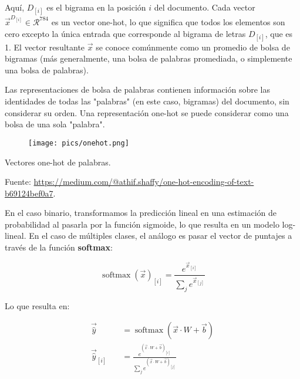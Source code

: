 Aquí, $D_{[i]}$ es el bigrama en la posición $i$ del documento. Cada vector $\vec{x}^{D_{[i]}} \in \mathcal{R}^{784}$ es un vector one-hot, lo que significa que todos los elementos son cero excepto la única entrada que corresponde al bigrama de letras $D_{[i]}$, que es 1. El vector resultante $\vec{x}$ se conoce comúnmente como un promedio de bolsa de bigramas (más generalmente, una bolsa de palabras promediada, o simplemente una bolsa de palabras).

Las representaciones de bolsa de palabras contienen información sobre las identidades de todas las "palabras" (en este caso, bigramas) del documento, sin considerar su orden. Una representación one-hot se puede considerar como una bolsa de una sola "palabra".

\begin{figure}[htb]
	\centering
	 \texttt{[image: pics/onehot.png]}
\end{figure}

Vectores one-hot de palabras.

Fuente: \url{https://medium.com/@athif.shaffy/one-hot-encoding-of-text-b69124bef0a7}.

En el caso binario, transformamos la predicción lineal en una estimación de probabilidad al pasarla por la función sigmoide, lo que resulta en un modelo log-lineal. En el caso de múltiples clases, el análogo es pasar el vector de puntajes a través de la función \textbf{softmax}:

\begin{equation}
 \operatorname{softmax}(\vec{x})_{[i]} = \frac{e^{\vec{x}_{[i]}}}{\sum_j e^{\vec{x}_{[j]}}}
\end{equation}

Lo que resulta en:

\begin{equation}
\begin{split}
\vec{\hat{y}} \quad & =  \operatorname{softmax}(\vec{x} \cdot W + \vec{b})  \\
\vec{\hat{y}}_{[i]} \quad & = \frac{e^{(\vec{x} \cdot W + \vec{b})_{[i]}}}{\sum_j e^{(\vec{x} \cdot W + \vec{b})_{[j]}}}
\end{split}
\end{equation}

